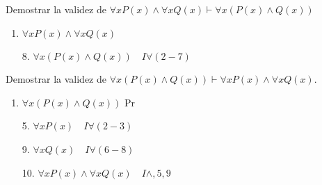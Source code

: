 \begin{example}
	Demostrar la validez de \(\forall  x P(x) \wedge  \forall x Q(x) \vdash \forall x (P(x) \wedge Q(x ))\)
	\begin{enumerate}
		\item \(\forall x P(x) \wedge  \forall  x Q(x )\)
	\end{enumerate}
	\begin{enumerate}
		\item[8.] \(\forall x (P(x) \wedge Q(x )) \quad I \forall (2-7 )\)
	\end{enumerate}
\end{example}

\begin{example}
	Demostrar la validez de \(\forall  x (P(x) \wedge Q(x)) \vdash \forall x P(x) \wedge \forall x Q(x )\).

	\begin{enumerate}
		\item \(\forall x (P(x) \wedge  Q(x ))\) Pr
	\end{enumerate}
	\begin{enumerate}
		\item[5.] \(\forall x P(x) \quad I \forall (2-3)\)
	\end{enumerate}
	\begin{enumerate}
		\item[9.] \(\forall x Q(x) \quad I \forall (6-8 )\)
		\item[10.] \(\forall x P(x) \wedge \forall  x Q(x ) \quad I \wedge,5,9\)
	\end{enumerate}
\end{example}

